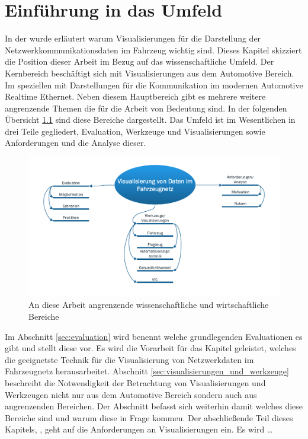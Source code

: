 \documentclass[draft=false
              ,paper=a4
              ,twoside=false
              ,fontsize=11pt
              ,headsepline
              ,BCOR10mm
              ,DIV11
              ]{scrbook}
\begin{document}
\chapter{Einführung in das Umfeld} %
\label{cha:umfeldanalyse}
In der  wurde erläutert warum Visualisierungen für die Darstellung der Netzwerkkommunikationsdaten im Fahrzeug wichtig sind. Dieses Kapitel skizziert die Position dieser Arbeit im Bezug auf das wissenschaftliche Umfeld. Der Kernbereich beschäftigt sich mit Visualisierungen aus dem Automotive Bereich. Im speziellen mit Darstellungen für die Kommunikation im modernen Automotive Realtime Ethernet. Neben diesem Hauptbereich gibt es mehrere weitere angrenzende Themen die für die Arbeit von Bedeutung sind. In der folgenden Übersicht \ref{fig:theme_overview} sind diese Bereiche dargestellt. Das Umfeld ist im Wesentlichen in drei Teile gegliedert, Evaluation, Werkzeuge und Visualisierungen sowie Anforderungen und die Analyse dieser. 

\begin{figure}[htbp]
  \centering
  \includegraphics[width=\textwidth]{img/theme_overview.pdf}
  \caption{An diese Arbeit angrenzende wissenschaftliche und wirtschaftliche Bereiche}
  \label{fig:theme_overview}
\end{figure}

Im Abschnitt \ref{sec:evaluation} wird benennt welche grundlegenden Evaluationen es gibt und stellt diese vor. Es wird die Vorarbeit für das Kapitel  geleistet, welches die geeignetste Technik für die Visualisierung von Netzwerkdaten im Fahrzeugnetz herausarbeitet. Abschnitt \ref{sec:visualisierungen_und_werkzeuge} beschreibt die Notwendigkeit der Betrachtung von Visualisierungen und Werkzeugen nicht nur aus dem Automotive Bereich sondern auch aus angrenzenden Bereichen. Der Abschnitt befasst sich weiterhin damit welches diese Bereiche sind und warum diese in Frage kommen. Der abschließende Teil dieses Kapitels, , geht auf die Anforderungen an Visualisierungen ein. Es wird \dots 
\end{document}
